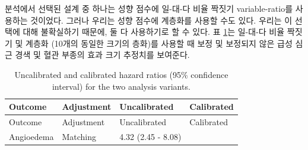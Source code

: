 \documentclass[10.5pt]{book}
\theoremstyle{definition}
\theoremstyle{definition}
\theoremstyle{definition}
\theoremstyle{remark}
\begin{document}
분석에서 선택된 설계 중 하나는 성향 점수에 일-대-다 비율 짝짓기
variable-ratio를 사용하는 것이었다. 그러나 우리는 성향 점수에 계층화를
사용할 수도 있다. 우리는 이 선택에 대해 불확실하기 때문에, 둘 다
사용하기로 할 수 있다. 표 \ref{tab:sensAnalysis}는 일-대-다 비율 짝짓기
및 계층화 (10개의 동일한 크기의 층화)를 사용할 때 보정 및 보정되지 않은
급성 심근 경색 및 혈관 부종의 효과 크기 추정치를 보여준다.

\begin{longtable}[]{@{}llll@{}}
\caption{\label{tab:sensAnalysis} Uncalibrated and calibrated hazard ratios
(95\% confidence interval) for the two analysis
variants.}\tabularnewline
\toprule
\begin{minipage}[b]{0.27\columnwidth}\raggedright\strut
Outcome\strut
\end{minipage} & \begin{minipage}[b]{0.15\columnwidth}\raggedright\strut
Adjustment\strut
\end{minipage} & \begin{minipage}[b]{0.17\columnwidth}\raggedright\strut
Uncalibrated\strut
\end{minipage} & \begin{minipage}[b]{0.17\columnwidth}\raggedright\strut
Calibrated\strut
\end{minipage}\tabularnewline
\midrule
\endfirsthead
\toprule
\begin{minipage}[b]{0.27\columnwidth}\raggedright\strut
Outcome\strut
\end{minipage} & \begin{minipage}[b]{0.15\columnwidth}\raggedright\strut
Adjustment\strut
\end{minipage} & \begin{minipage}[b]{0.17\columnwidth}\raggedright\strut
Uncalibrated\strut
\end{minipage} & \begin{minipage}[b]{0.17\columnwidth}\raggedright\strut
Calibrated\strut
\end{minipage}\tabularnewline
\midrule
\endhead
\begin{minipage}[t]{0.27\columnwidth}\raggedright\strut
Angioedema\strut
\end{minipage} & \begin{minipage}[t]{0.15\columnwidth}\raggedright\strut
Matching\strut
\end{minipage} & \begin{minipage}[t]{0.17\columnwidth}\raggedright\strut
4.32 (2.45 - 8.08)\strut
\end{minipage} & \begin{minipage}[t]{0.17\columnwidth}\raggedright\strut

\end{minipage}
\end{longtable}
\end{document}
